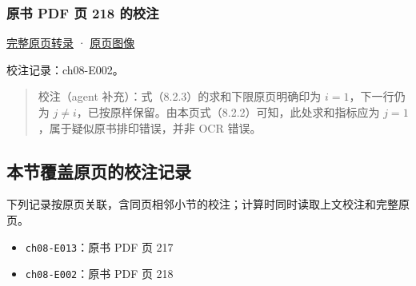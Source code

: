 \documentclass[
  10pt,
  fontset=fandol]{ctexart}
\providecommand{\tightlist}{%
  \setlength{\itemsep}{0pt}\setlength{\parskip}{0pt}}
\begin{document}
\subsubsection{原书 PDF 页 218 的校注}\label{ux539fux4e66-pdf-ux9875-218-ux7684ux6821ux6ce8}

\href{../pages/pdf-218.md}{完整原页转录} · \href{../../source-images/pdf-218.jpeg}{原页图像}

校注记录：ch08-E002。

\begin{quote}
校注（agent 补充）：式（8.2.3）的求和下限原页明确印为 \(i=1\)，下一行仍为 \(j\neq i\)，已按原样保留。由本页式（8.2.2）可知，此处求和指标应为 \(j=1\)，属于疑似原书排印错误，并非 OCR 错误。
\end{quote}

\subsection{本节覆盖原页的校注记录}\label{ux672cux8282ux8986ux76d6ux539fux9875ux7684ux6821ux6ce8ux8bb0ux5f55}

下列记录按原页关联，含同页相邻小节的校注；计算时同时读取上文校注和完整原页。

\begin{itemize}
\tightlist
\item
  \texttt{ch08-E013}：原书 PDF 页 217
\item
  \texttt{ch08-E002}：原书 PDF 页 218
\end{itemize}
\end{document}
